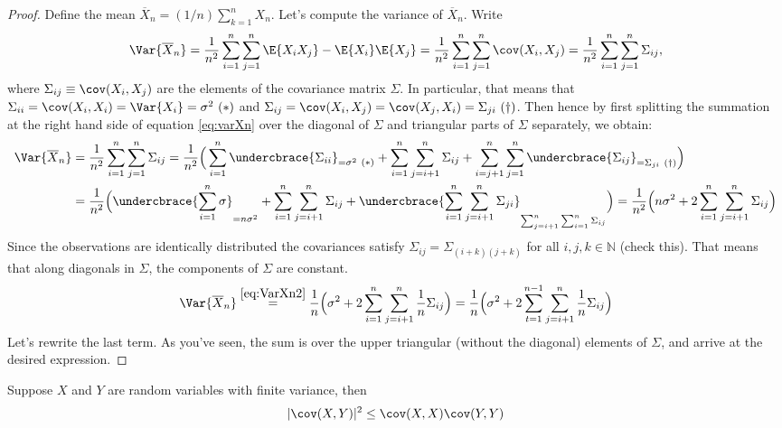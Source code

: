 \documentclass[11pt,english,a4paper]{article}
\begin{document}
\begin{proof}
Define the mean $\overline X_n = (1/n)\sum_{k=1}^n X_n$. Let's compute the variance of $\overline X_n$. Write
\begin{equation}
\Var{\overline X_n} = \frac{1}{n^2} \sum_{i=1}^n\sum_{j=1}^n \E{X_iX_j} - \E{X_i}\E{X_j} = \frac{1}{n^2} \sum_{i=1}^n\sum_{j=1}^n \cov (X_i,X_j) = \frac{1}{n^2} \sum_{i=1}^n\sum_{j=1}^n \Sigma_{ij}, \label{eq:varXn}
\end{equation}
where $\Sigma_{ij} \equiv \cov (X_i,X_j)$ are the elements of the covariance matrix $\Sigma$. In particular, that means that $\Sigma_{ii} = \cov (X_i,X_i) = \Var{X_i} = \sigma^2 \ (*)$ and $\Sigma_{ij} = \cov (X_i,X_j) = \cov (X_j,X_i) = \Sigma_{ji} \ (\dagger)$. Then hence by first splitting the summation at the right hand side of equation \eqref{eq:varXn} over the diagonal of $\Sigma$ and triangular parts of $\Sigma$ separately, we obtain:
\begin{align}
\Var{\overline X_n} &= \frac{1}{n^2}\sum_{i=1}^n\sum_{j=1}^n \Sigma_{ij} = \frac{1}{n^2} \Big( \sum_{i = 1}^n \undercbrace{\Sigma_{ii}}_{= \sigma^2 \ (*)} +  \sum_{i=1}^n\sum_{j=i+1}^n \Sigma_{ij} + \sum_{i=j+1}^n\sum_{j=1}^n \undercbrace{\Sigma_{ij} }_{=  \Sigma_{ji} \ (\dagger) } \Big) \nonumber \\
&= \frac{1}{n^2} \Big( \undercbrace{\sum_{i=1}^n \sigma}_{=n\sigma^2} + \sum_{i=1}^n\sum_{j= i+1}^n \Sigma_{ij} + \undercbrace{\sum_{i=1}^n\sum_{j= i+1}^n \Sigma_{ji} }_{\sum_{j= i+1}^n\sum_{i=1}^n \Sigma_{ij}} \Big) = \frac{1}{n^2} \Big( n \sigma^2 + 2\sum_{i=1}^n\sum_{j= i+1}^n \Sigma_{ij} \Big) \label{eq:VarXn2}
\end{align}
Since the observations are identically distributed the covariances satisfy $\Sigma_{ij} = \Sigma_{(i+k)(j+k)}$ for all $i,j,k \in \mathbb{N}$ (check this). That means that along diagonals in $\Sigma$, the components of $\Sigma$ are constant.
\[
\Var{ \overline X_n } \stackrel{ \eqref{eq:VarXn2} }{=} \frac{1}{n} \Big( \sigma^2 + 2\sum_{i=1}^n\sum_{j= i+1}^n \frac{1}{n}\Sigma_{ij} \Big) = \frac{1}{n} \Big( \sigma^2 + 2\sum_{t=1}^{n-1}\sum_{j= i+1}^n \frac{1}{n}\Sigma_{ij} \Big)
\]
 Let's rewrite the last term. As you've seen, the sum is over the upper triangular (without the diagonal) elements of $\Sigma$, and arrive at the desired expression.
\end{proof}
\begin{lemma*}
Suppose $X$ and $Y$ are random variables with finite variance, then
\[
| \cov (X,Y) |^2 \leq \cov (X,X) \cov (Y,Y)
\]
\label{lemma:inequality}
\end{lemma*}
\end{document}

